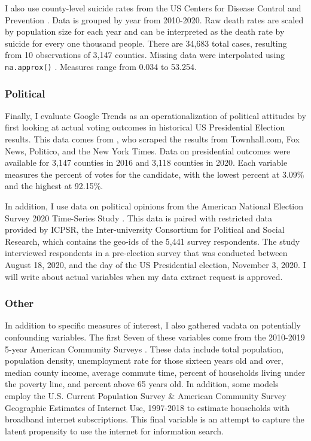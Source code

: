 I also use county-level suicide rates from the US Centers for Disease Control
and Prevention \citeyearpar{suic_data}. Data is grouped by year from 2010-2020. Raw death
rates are scaled by population size for each year and can be interpreted as the
death rate by suicide for every one thousand people. There are 34,683 total
cases, resulting from 10 observations of 3,147 counties. Missing data were interpolated using
\texttt{na.approx()} \citep{zoo}. Measures range from 0.034 to 53.254.

\subsubsection{Political}

Finally, I evaluate Google Trends as an operationalization of political
attitudes by first looking at actual voting outcomes in historical US
Presidential Election results. This data comes from  \citet{pres_data}, who scraped the
results from Townhall.com, Fox News, Politico, and the New York Times. Data on 
presidential outcomes were available for 3,147 counties in 2016 and
3,118 counties in 2020. Each variable measures the percent of votes
for the candidate, with the lowest percent at 3.09\% and the highest at 92.15\%.

In addition, I use data on political opinions from the American National
Election Survey 2020 Time-Series Study \citep{anes_data}. This data is paired with
restricted data provided by ICPSR, the Inter-university Consortium for Political
and Social Research, which contains the geo-ids of the 5,441
survey respondents. The study interviewed respondents in a pre-election survey
that was conducted between August 18, 2020, and the day of the US Presidential
election, November 3, 2020.  %
I will write about actual variables when my data extract request is approved. 


\subsubsection{Other}

In addition to specific measures of interest, I also gathered vadata on potentially
confounding variables. The first Seven of these
variables come from the 2010-2019 5-year American Community Surveys
\citep{acs2019, acs2018, acs2017, acs2016, acs2015, acs2014, acs2013, acs2012, acs2011, acs2010}. 
These data include total population, population density,
unemployment rate for those sixteen years old and over, median county income, average commute
time, percent of households living under the poverty line, and percent above 65
years old. In addition, some models employ the U.S. Current Population Survey \&
American Community Survey Geographic Estimates of Internet Use, 1997-2018
\citep{internet_use} to estimate households with broadband internet subscriptions.
This final variable is an attempt to capture the latent propensity to use the
internet for information search.

